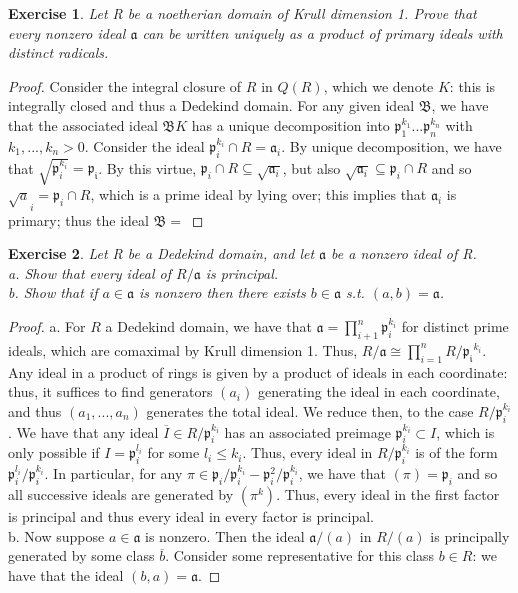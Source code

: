 \documentclass{article}
\newcommand{\fk}[1]{\mathfrak{#1}}
\newtheorem{exercise}{Exercise}
\begin{document}
\begin{exercise}
  Let R be a noetherian domain of Krull dimension 1. Prove that every nonzero ideal $\fk{a}$ can be written uniquely as a product of primary ideals with distinct radicals.
\end{exercise}
\begin{proof}
  Consider the integral closure of $R$ in $Q(R)$, which we denote $K$: this is integrally closed and thus a Dedekind domain. For any given ideal $\fk{B}$, we have that the associated ideal $\fk{B} K$ has a unique decomposition into $\fk{p}_{1}^{k_{1}}...\fk{p}_{n}^{k_{n}}$ with $k_{1},...,k_{n} > 0$. Consider the ideal $\fk{p}_{i}^{k_{i}} \cap R = \fk{a}_{i}$. By unique decomposition, we have that $\sqrt{\fk{p}_{i}^{k_{i}}} = \fk{p_{i}}$. By this virtue, $\fk{p}_{i}\cap R \subseteq \sqrt{\fk{a}_{i}}$, but also $\sqrt{\fk{a}_{i}} \subseteq \fk{p}_{i} \cap R$ and so $\sqrt{a}_{i} = \fk{p}_{i}\cap R$, which is a prime ideal by lying over; this implies that $\fk{a}_{i}$ is primary; thus the ideal $\fk{B} = $
\end{proof}

\begin{exercise}
  Let R be a Dedekind domain, and let $\fk{a}$ be a nonzero ideal of R. \\
  a. Show that every ideal of $R/\fk{a}$ is principal.  \\
  b. Show that if $a \in \fk{a}$ is nonzero then there exists $b \in \fk{a}$ s.t. $(a,b) = \fk{a}$.
\end{exercise}
\begin{proof}
  a. For $R$ a Dedekind domain, we have that $\fk{a} = \prod_{i+1}^{n} \fk{p}_{i}^{k_{i}}$ for distinct prime ideals, which are comaximal by Krull dimension 1. Thus, $R/ \fk{a} \cong \prod_{i=1}^{n} R/\fk{p_{i}}^{k_{i}}$. Any ideal in a product of rings is given by a product of ideals in each coordinate: thus, it suffices to find generators $(a_{i})$ generating the ideal in each coordinate, and thus $(a_{1},...,a_{n})$ generates the total ideal. We reduce then, to the case $R/\fk{p}_{i}^{k_{i}}$. We have that any ideal $\overline I \in R/\fk{p}_{i}^{k_{i}}$ has an associated preimage $\fk{p}_{i}^{k_{i}}\subset I$, which is only possible if $I = \fk{p}_{i}^{l_{i}}$ for some $l_{i} \leq k_{i}$. Thus, every ideal in $R/\fk{p}_{i}^{k_{i}}$ is of the form $\fk{p}_{i}^{l_{i}}/ \fk{p}_{i}^{k_{i}}$. In particular, for any $\pi \in \fk{p}_{i} / \fk{p}_{i}^{k_{i}} - \fk{p}_{i}^{2} / \fk{p}_{i}^{k_{i}}$, we have that $(\pi) = \fk{p}_{i}$ and so all successive ideals are generated by $(\pi^{k})$. Thus, every ideal in the first factor is principal and thus every ideal in every factor is principal.  \\
  b. Now suppose $a \in \fk{a}$ is nonzero. Then the ideal $\fk{a}/(a)$ in $R/(a)$ is principally generated by some class $\overline b$. Consider some representative for this class $b \in R$: we have that the ideal $(b,a) = \fk{a}$. 
\end{proof}
\end{document}
